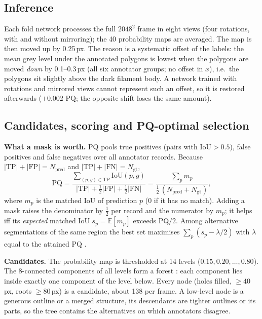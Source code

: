 \documentclass[sigconf]{acmart}
\begin{document}
\subsection{Inference}\label{sec:infer}
    Each fold network processes the full $2048^2$ frame in eight views (four rotations, with and without mirroring); the 40 probability maps are averaged.
    The map is then moved up by 0.25\,px. The reason is a systematic offset of the labels: the mean grey level under the annotated polygons is lowest when the polygons are moved \emph{down} by 0.1--0.3\,px (all six annotator groups; no offset in $x$), i.e.\ the polygons sit slightly above the dark filament body. A network trained with rotations and mirrored views cannot represent such an offset, so it is restored afterwards ($+0.002$ PQ; the opposite shift loses the same amount).

\subsection{Candidates, scoring and PQ-optimal selection}\label{sec:select}
    \textbf{What a mask is worth.} PQ \cite{kirillov2019panoptic} pools true positives (pairs with $\mathrm{IoU}>0.5$), false positives and false negatives over all annotator records. Because $|\mathrm{TP}|+|\mathrm{FP}|=N_{\mathrm{pred}}$ and $|\mathrm{TP}|+|\mathrm{FN}|=N_{\mathrm{gt}}$,
    \begin{equation}
        \mathrm{PQ}=\frac{\sum_{(p,g)\in \mathrm{TP}}\mathrm{IoU}(p,g)}{|\mathrm{TP}|+\tfrac12|\mathrm{FP}|+\tfrac12|\mathrm{FN}|}
        =\frac{\sum_{p} m_p}{\tfrac12\,(N_{\mathrm{pred}}+N_{\mathrm{gt}})},
    \end{equation}
    where $m_p$ is the matched IoU of prediction $p$ ($0$ if it has no match). Adding a mask raises the denominator by $\tfrac12$ per record and the numerator by $m_p$; it helps iff its \emph{expected} matched IoU $s_p=\mathbb{E}[m_p]$ exceeds $\mathrm{PQ}/2$. Among alternative segmentations of the same region the best set maximises $\sum_p (s_p-\lambda/2)$ with $\lambda$ equal to the attained PQ \cite{dinkelbach1967fractional}.

    \textbf{Candidates.} The probability map is thresholded at 14 levels ($0.15,0.20,\dots,0.80$). The 8-connected components of all levels form a forest \cite{salembier1998maxtree}: each component lies inside exactly one component of the level below. Every node (holes filled, $\ge 40$\,px, roots $\ge 80$\,px) is a candidate, about 138 per frame. A low-level node is a generous outline or a merged structure, its descendants are tighter outlines or its parts, so the tree contains the alternatives on which annotators disagree.
\end{document}
